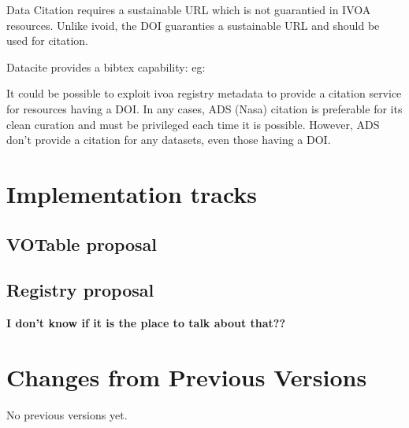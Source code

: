 \documentclass[11pt,a4paper]{ivoa}
\begin{document}
Data Citation requires a sustainable URL which is not guarantied in IVOA resources. 
Unlike ivoid, the DOI guaranties a sustainable URL and should be used for citation. 

Datacite provides a bibtex capability:
eg:


It could be possible to exploit ivoa registry metadata to provide a citation service for resources having a DOI.
In any cases, ADS (Nasa) citation is preferable for its clean curation and must be privileged each time it is possible.
However, ADS don't provide a citation for any datasets, even those having a DOI.





\section{Implementation tracks}

\subsection{VOTable proposal}

\subsection{Registry proposal}
\textbf{I don't know if it is the place to talk about that??}

%

\appendix
\section{Changes from Previous Versions}

No previous versions yet.  






\end{document}
